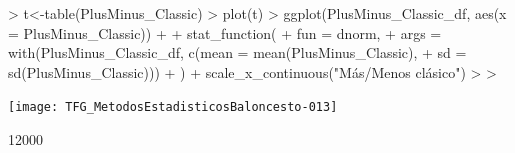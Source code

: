 \documentclass[paper=a4, fontsize=9pt]{article}
\begin{document}
\begin{Schunk}
\begin{Sinput}
> t<-table(PlusMinus_Classic)
> plot(t)
> ggplot(PlusMinus_Classic_df, aes(x = PlusMinus_Classic)) +
+   stat_function(
+     fun = dnorm, 
+     args = with(PlusMinus_Classic_df, c(mean = mean(PlusMinus_Classic), 
+                                       sd = sd(PlusMinus_Classic)))
+   ) + scale_x_continuous("Más/Menos clásico")
> 
> 
\end{Sinput}
\end{Schunk}
\texttt{[image: TFG\_MetodosEstadisticosBaloncesto-013]}

\begin{Schunk}
\begin{Soutput}
[1] 12000
\end{Soutput}
\end{Schunk}
\end{document}
